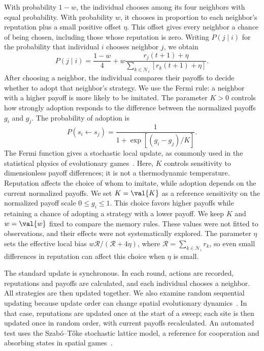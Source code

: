 \documentclass[physics,article,submit,moreauthors]{Definitions/mdpi}
\begin{document}
With probability $1-w$, the individual chooses among its four neighbors with equal probability. With probability $w$, it chooses in proportion to each neighbor's reputation plus a small positive offset $\eta$. This offset gives every neighbor a chance of being chosen, including those whose reputation is zero. Writing $P(j\mid i)$ for the probability that individual $i$ chooses neighbor $j$, we obtain
\begin{equation}
 P(j\mid i)=\frac{1-w}{4}
       +w\frac{r_j(t+1)+\eta}{\sum_{k\in\mathcal N_i}[r_k(t+1)+\eta]}.
 \label{eq:reference}
\end{equation}
After choosing a neighbor, the individual compares their payoffs to decide whether to adopt that neighbor's strategy. We use the Fermi rule: a neighbor with a higher payoff is more likely to be imitated. The parameter $K>0$ controls how strongly adoption responds to the difference between the normalized payoffs $g_i$ and $g_j$. The probability of adoption is
\begin{equation}
 P(s_i\leftarrow s_j)=\frac{1}{1+\exp[(g_i-g_j)/K]}.
 \label{eq:fermi}
\end{equation}
The Fermi function gives a stochastic local update, as commonly used in the statistical physics of evolutionary games~\cite{perc2017}. Here, $K$ controls sensitivity to dimensionless payoff differences; it is not a thermodynamic temperature. Reputation affects the choice of whom to imitate, while adoption depends on the current normalized payoffs. We set $K=\val{K}$ as a reference sensitivity on the normalized payoff scale $0\leq g_i\leq1$. This choice favors higher payoffs while retaining a chance of adopting a strategy with a lower payoff. We keep $K$ and $w=\val{w}$ fixed to compare the memory rules. These values were not fitted to observations, and their effects were not systematically explored. The parameter $\eta$ sets the effective local bias $w\mathcal R/(\mathcal R+4\eta)$, where $\mathcal R=\sum_{k\in\mathcal N_i}r_k$, so even small differences in reputation can affect this choice when $\eta$ is small.

The standard update is synchronous. In each round, actions are recorded, reputations and payoffs are calculated, and each individual chooses a neighbor. All strategies are then updated together. We also examine random sequential updating because update order can change spatial evolutionary dynamics~\cite{huberman1993}. In that case, reputations are updated once at the start of a sweep; each site is then updated once in random order, with current payoffs recalculated. An automated test uses the Szab\'o--T\H{o}ke stochastic lattice model, a reference for cooperation and absorbing states in spatial games~\cite{szabo1998}.
\end{document}
